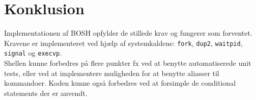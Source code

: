 \section{Konklusion}
Implementationen af BOSH opfylder de stillede krav og fungerer som forventet. Kravene er implementeret ved hjælp af systemkaldene: \texttt{fork}, \texttt{dup2}, \texttt{waitpid}, \texttt{signal} og \texttt{execvp}.\\

Shellen kunne forbedres på flere punkter fx ved at benytte automatiserede unit tests, eller ved at implementere muligheden for at benytte aliasser til kommandoer. Koden kunne også forbedres ved at forsimple de conditional statements der er anvendt.